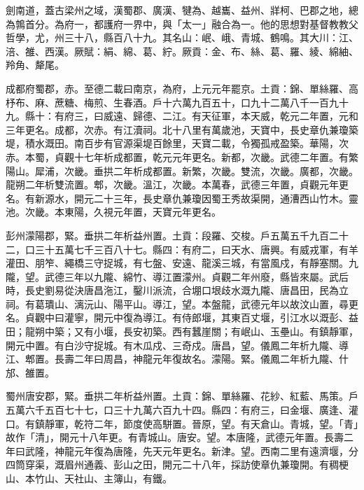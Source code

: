 
\begin{pinyinscope}

 劍南道，蓋古梁州之域，漢蜀郡、廣漢、犍為、越巂、益州、牂柯、巴郡之地，總為鶉首分。為府一，都護府一界中，與「太一」融合為一。他的思想對基督教教父哲學，尤，州三十八，縣百八十九。其名山：岷、峨、青城、鶴鳴。其大川：江、涪、雒、西漢。厥賦：絹、綿、葛、紵。厥貢：金、布、絲、葛、羅、綾、綿紬、羚角、犛尾。



 成都府蜀郡，赤。至德二載曰南京，為府，上元元年罷京。土貢：錦、單絲羅、高杼布、麻、蔗糖、梅煎、生春酒。戶十六萬九百五十，口九十二萬八千一百九十九。縣十：有府三，曰威遠、歸德、二江。有天征軍，本天威，乾元二年置，元和三年更名。成都，次赤。有江瀆祠。北十八里有萬歲池，天寶中，長史章仇兼瓊築堤，積水溉田。南百步有官源渠堤百餘里，天寶二載，令獨孤戒盈築。華陽，次赤。本蜀，貞觀十七年析成都置，乾元元年更名。新都，次畿。武德二年置。有繁陽山。犀浦，次畿。垂拱二年析成都置。新繁，次畿。雙流，次畿。廣都，次畿。龍朔二年析雙流置。郫，次畿。溫江，次畿。本萬春，武德三年置，貞觀元年更名。有新源水，開元二十三年，長史章仇兼瓊因蜀王秀故渠開，通漕西山竹木。靈池。次畿。本東陽，久視元年置，天寶元年更名。



 彭州濛陽郡，緊。垂拱二年析益州置。土貢：段羅、交梭。戶五萬五千九百二十二，口三十五萬七千三百八十七。縣四：有府二，曰天水、唐興。有威戎軍，有羊灌田、朋笮、繩橋三守捉城，有七盤、安遠、龍溪三城，有當風戍，有靜塞關。九隴，望。武德三年以九隴、綿竹、導江置濛州。貞觀二年州廢，縣皆來屬。武后時，長史劉易從決唐昌沲江，鑿川派流，合堋口垠歧水溉九隴、唐昌田，民為立祠。有葛璝山、漓沅山、陽平山。導江，望。本盤龍，武德元年以故汶山置，尋更名。貞觀中曰灌寧，開元中復為導江。有侍郎堰，其東百丈堰，引江水以溉彭、益田；龍朔中築；又有小堰，長安初築。西有蠶崖關；有岷山、玉壘山。有鎮靜軍，開元中置。有白沙守捉城。有木瓜戍、三奇戍。唐昌，望。儀鳳二年析九隴、導江、郫置。長壽二年曰周昌，神龍元年復故名。濛陽。緊。儀鳳二年析九隴、什邡、雒置。



 蜀州唐安郡，緊。垂拱二年析益州置。土貢：錦、單絲羅、花紗、紅藍、馬策。戶五萬六千五百七十七，口三十九萬六百九十四。縣四：有府三，曰金堰、廣逢、灌口。有鎮靜軍，乾符二年，節度使高駢置。晉原，望。有天倉山。青城，望。「青」故作「清」，開元十八年更。有青城山。唐安。望。本唐隆，武德元年置。長壽二年曰武隆，神龍元年復為唐隆，先天元年更名。新津。望。西南二里有遠濟堰，分四筒穿渠，溉眉州通義、彭山之田，開元二十八年，採訪使章仇兼瓊開。有稠梗山、本竹山、天社山、主簿山，有鐵。




\end{pinyinscope}
